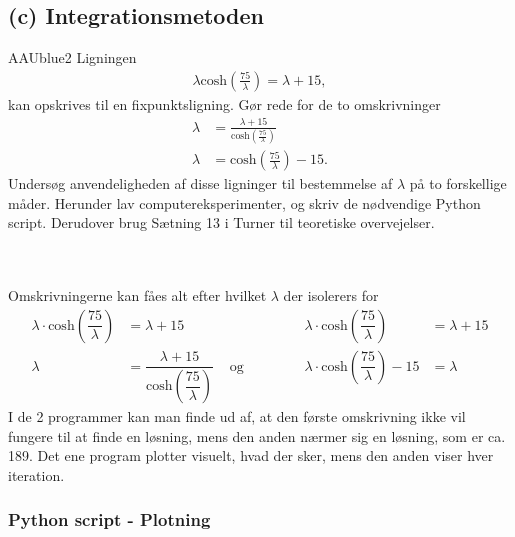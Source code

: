 \subsection*{(c) Integrationsmetoden}
%
\begin{color}{AAUblue2}
Ligningen 
\begin{align*}
\lambda \text{cosh}\left( \frac{75}{\lambda} \right) = \lambda + 15,
\end{align*}
kan opskrives til en fixpunktsligning. 
Gør rede for de to omskrivninger 
\begin{align*}
\lambda & = \frac{ \lambda + 15}{ \text{cosh} \left( \frac{75}{\lambda} \right) } \\
\lambda & = \text{cosh} \left( \frac{75}{\lambda} \right) -15.
\end{align*}
Undersøg anvendeligheden af disse ligninger til bestemmelse af $\lambda$ på to forskellige måder. Herunder lav computereksperimenter, og skriv de nødvendige Python script. 
Derudover brug Sætning 13 i Turner til teoretiske overvejelser.  
\end{color}
\\\\
%
Omskrivningerne kan fåes alt efter hvilket $\lambda$ der isolerers for
$$
\begin{array}{rlcrl}
\lambda \cdot \text{cosh}(\dfrac{75}{\lambda})&=\lambda+15 & \phantom{matematik} & \lambda \cdot \text{cosh}(\dfrac{75}{\lambda})&=\lambda+15\\
\lambda &=\dfrac{\lambda+15}{\text{cosh}(\dfrac{75}{\lambda})} & \text{ og } & \lambda \cdot \text{cosh}(\dfrac{75}{\lambda})-15 &=\lambda
\end{array}
$$ 
%
%
I de 2 programmer kan man finde ud af, at den første omskrivning ikke vil fungere til at finde en løsning, mens den anden nærmer sig en løsning, som er ca. 189. Det ene program plotter visuelt, hvad der sker, mens den anden viser hver iteration.
% 
%
\subsubsection*{Python script - Plotning}
%
\lstset{style=mystyle}

%
